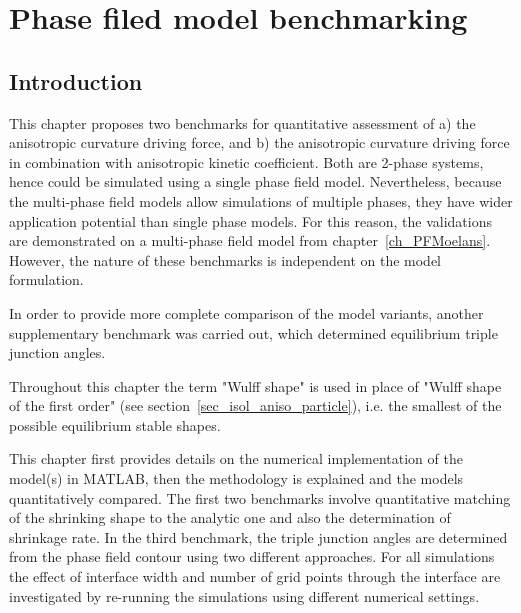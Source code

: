 \chapter{Phase filed model benchmarking}
\label{ch_paper1}
\section{Introduction}
\label{sec_P1_Intro}

This chapter proposes two benchmarks for quantitative assessment of a) the anisotropic curvature driving force, and b) the anisotropic curvature driving force in combination with anisotropic kinetic coefficient. Both are 2-phase systems, hence could be simulated using a single phase field model. Nevertheless, because the multi-phase field models allow simulations of multiple phases, they have wider application potential than single phase models. For this reason, the validations are demonstrated on a multi-phase field model from chapter~\ref{ch_PFMoelans}. However, the nature of these benchmarks is independent on the model formulation. 

In order to provide more complete comparison of the model variants, another supplementary benchmark was carried out, which determined equilibrium triple junction angles.

Throughout this chapter the term "Wulff shape" is used in place of "Wulff shape of the first order" (see section~\ref{sec_isol_aniso_particle}), i.e. the smallest of the possible equilibrium stable shapes. 

This chapter first provides details on the numerical implementation of the model(s) in MATLAB, then the methodology is explained and the models quantitatively compared. The first two benchmarks involve quantitative matching of the shrinking shape to the analytic one and also the determination of shrinkage rate. In the third benchmark, the triple junction angles are determined from the phase field contour using two different approaches. For all simulations the effect of interface width and number of grid points through the interface are investigated by re-running the simulations using different numerical settings.


